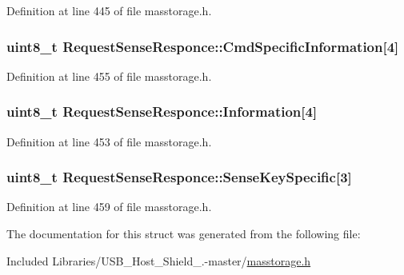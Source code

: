 \-Definition at line 445 of file masstorage.\-h.

\hypertarget{struct_request_sense_responce_ab2f0cab24692ca29dffc231f31198726}{
\subsubsection[{\-Cmd\-Specific\-Information}]{\setlength{\rightskip}{0pt plus 5cm}uint8\-\_\-t {\bf \-Request\-Sense\-Responce\-::\-Cmd\-Specific\-Information}\mbox{[}4\mbox{]}}}\label{struct_request_sense_responce_ab2f0cab24692ca29dffc231f31198726}


\-Definition at line 455 of file masstorage.\-h.

\hypertarget{struct_request_sense_responce_a4342aa28405753a185d867060fec931e}{
\subsubsection[{\-Information}]{\setlength{\rightskip}{0pt plus 5cm}uint8\-\_\-t {\bf \-Request\-Sense\-Responce\-::\-Information}\mbox{[}4\mbox{]}}}\label{struct_request_sense_responce_a4342aa28405753a185d867060fec931e}


\-Definition at line 453 of file masstorage.\-h.

\hypertarget{struct_request_sense_responce_a61d034714befc2fa0fb7dcea30942324}{
\subsubsection[{\-Sense\-Key\-Specific}]{\setlength{\rightskip}{0pt plus 5cm}uint8\-\_\-t {\bf \-Request\-Sense\-Responce\-::\-Sense\-Key\-Specific}\mbox{[}3\mbox{]}}}\label{struct_request_sense_responce_a61d034714befc2fa0fb7dcea30942324}


\-Definition at line 459 of file masstorage.\-h.



\-The documentation for this struct was generated from the following file\-:\begin{DoxyCompactItemize}
\item 
\-Included Libraries/\-U\-S\-B\-\_\-\-Host\-\_\-\-Shield\-\_.-\/master/\hyperlink{masstorage_8h}{masstorage.\-h}\end{DoxyCompactItemize}
